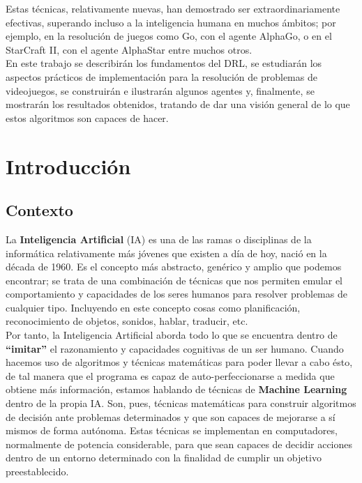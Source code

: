 \documentclass[11pt,fleqn]{book} %
\begin{document}
Estas técnicas, relativamente nuevas, han demostrado ser extraordinariamente efectivas, superando incluso a la inteligencia humana en muchos ámbitos; por ejemplo, en la resolución de juegos como Go, con el agente AlphaGo, o en el StarCraft II, con el agente AlphaStar entre muchos otros. \\

En este trabajo se describirán los fundamentos del DRL, se estudiarán los aspectos prácticos de implementación para la resolución de problemas de videojuegos, se construirán e ilustrarán algunos agentes y, finalmente, se mostrarán los resultados obtenidos, tratando de dar una visión general de lo que estos algoritmos son capaces de hacer.

\part{Introducción}

\usechapterimagetrue
{} %

\chapter{Contexto}\label{sec:introduccion}

La \textbf{Inteligencia Artificial} (IA) es una de las ramas o disciplinas de la informática relativamente más jóvenes que existen a día de hoy, nació en la década de 1960. Es el concepto más abstracto, genérico y amplio que podemos encontrar; se trata de una combinación de técnicas que nos permiten emular el comportamiento y capacidades de los seres humanos para resolver problemas de cualquier tipo. Incluyendo en este concepto cosas como planificación, reconocimiento de objetos, sonidos, hablar, traducir, etc.\cite{article:IA} \\

Por tanto, la Inteligencia Artificial aborda todo lo que se encuentra dentro de \textbf{``imitar''} el razonamiento y capacidades cognitivas de un ser humano. Cuando hacemos uso de algoritmos y técnicas matemáticas para poder llevar a cabo ésto, de tal manera que el programa es capaz de auto-perfeccionarse a medida que obtiene más información, estamos hablando de técnicas de \textbf{Machine Learning} dentro de la propia IA. Son, pues, técnicas matemáticas para construir algoritmos de decisión ante problemas determinados y que son capaces de mejorarse a sí mismos de forma autónoma. Estas técnicas se implementan en computadores, normalmente de potencia considerable, para que sean capaces de decidir acciones dentro de un entorno determinado con la finalidad de cumplir un objetivo preestablecido. \\
\end{document}
